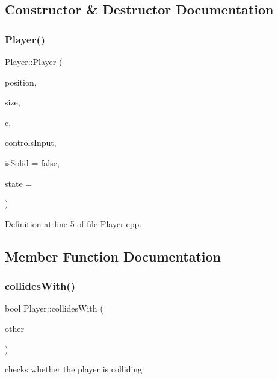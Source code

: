 \subsection{Constructor \& Destructor Documentation}
\mbox{\label{class_player_afa77ee030e5d4e529de48e678800a173}} 
\subsubsection{\texorpdfstring{Player()}{Player()}}
{\footnotesize\ttfamily Player\+::\+Player (\begin{DoxyParamCaption}\item[{Vector2f}]{position,  }\item[{Vector2f}]{size,  }\item[{\hyperlink{class_cursor}{Cursor} \&}]{c,  }\item[{\hyperlink{struct_controls_input}{Controls\+Input} \&}]{controls\+Input,  }\item[{bool}]{is\+Solid = {\ttfamily false},  }\item[{int}]{state = {} }\end{DoxyParamCaption})}



Definition at line 5 of file Player.\+cpp.



\subsection{Member Function Documentation}
\mbox{\label{class_player_a2c1775f5add97e680e7cd538e8dddda3}} 
\subsubsection{\texorpdfstring{collides\+With()}{collidesWith()}}
{\footnotesize\ttfamily bool Player\+::collides\+With (\begin{DoxyParamCaption}\item[{\hyperlink{class_entity}{Entity} $\ast$}]{other }\end{DoxyParamCaption})}



checks whether the player is colliding 


